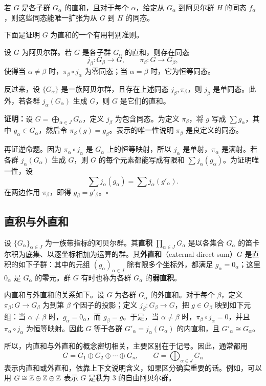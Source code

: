 若 $G$ 是各子群 $G_\alpha$ 的直和，且对于每个 $\alpha$，给定从 $G_\alpha$ 到阿贝尔群 $H$ 的同态 $f_\alpha$，则这些同态能唯一扩张为从 $G$ 到 $H$ 的同态。

下面是证明 $G$ 为直和的一个有用判别准则。

设 $G$ 为阿贝尔群。若 $G$ 是各子群 $G_\alpha$ 的直和，则存在同态
\[
j_\beta:G_\beta\to G,\qquad \pi_\beta:G\to G_\beta,
\]
使得当 $\alpha\ne\beta$ 时，$\pi_\beta\circ j_\alpha$ 为零同态；当 $\alpha=\beta$ 时，它为恒等同态。

反过来，设 $\{G_\alpha\}$ 是一族阿贝尔群，且存在上述同态 $j_\beta,\pi_\beta$，则 $j_\beta$ 是单同态。此外，若各群 $j_\alpha(G_\alpha)$ 生成 $G$，则 $G$ 是它们的直和。

\noindent\textbf{证明：}设 $G=\bigoplus_{\alpha\in J}G_\alpha$，定义 $j_\beta$ 为包含同态。为定义 $\pi_\beta$，将 $g$ 写成 $\sum g_\alpha$，其中 $g_\alpha\in G_\alpha$，然后令 $\pi_\beta(g)=g_\beta$。表示的唯一性说明 $\pi_\beta$ 是良定义的同态。

再证逆命题。因为 $\pi_\alpha\circ j_\alpha$ 是 $G_\alpha$ 上的恒等映射，所以 $j_\alpha$ 是单射，$\pi_\alpha$ 是满射。若各群 $j_\alpha(G_\alpha)$ 生成 $G$，则 $G$ 的每个元素都能写成有限和 $\sum j_\alpha(g_\alpha)$。为证明唯一性，设
\[
\sum j_\alpha(g_\alpha)=\sum j_\alpha(g'_\alpha).
\]
在两边作用 $\pi_\beta$，即得 $g_\beta=g'_\beta$。\hfill$\square$

\subsection*{直积与外直和}
设 $\{G_\alpha\}_{\alpha\in J}$ 为一族带指标的阿贝尔群。其\textbf{直积} $\prod_{\alpha\in J}G_\alpha$ 是以各集合 $G_\alpha$ 的笛卡尔积为底集、以逐坐标相加为运算的群。其\textbf{外直和}（external direct sum）$G$ 是直积的如下子群：其中的元组 $(g_\alpha)_{\alpha\in J}$ 除有限多个坐标外，都满足 $g_\alpha=0_\alpha$；这里 $0_\alpha$ 是 $G_\alpha$ 的零元。群 $G$ 有时也称为各群 $G_\alpha$ 的\textbf{弱直积}。

内直和与外直和的关系如下。设 $G$ 为各群 $G_\alpha$ 的外直和。对于每个 $\beta$，定义 $\pi_\beta:G\to G_\beta$ 为到第 $\beta$ 个因子的投影；定义 $j_\beta:G_\beta\to G$，把 $g\in G_\beta$ 映到如下元组：当 $\alpha\ne\beta$ 时，$g_\alpha=0_\alpha$，而 $g_\beta=g$。于是，当 $\alpha\ne\beta$ 时，$\pi_\beta\circ j_\alpha=0$，并且 $\pi_\alpha\circ j_\alpha$ 为恒等映射。因此 $G$ 等于各群 $G'_\alpha=j_\alpha(G_\alpha)$ 的内直和，且 $G'_\alpha\cong G_\alpha$。

所以，内直和与外直和的概念密切相关，主要区别在于记号。因此，通常都用
\[
G=G_1\oplus G_2\oplus\cdots\oplus G_n,\qquad
G=\bigoplus_{\alpha\in J}G_\alpha
\]
表示内直和或外直和，依靠上下文说明含义，如果区分确实重要的话。例如，可以用 $G\cong\mathbb{Z}\oplus\mathbb{Z}\oplus\mathbb{Z}$ 表示 $G$ 是秩为 $3$ 的自由阿贝尔群。

